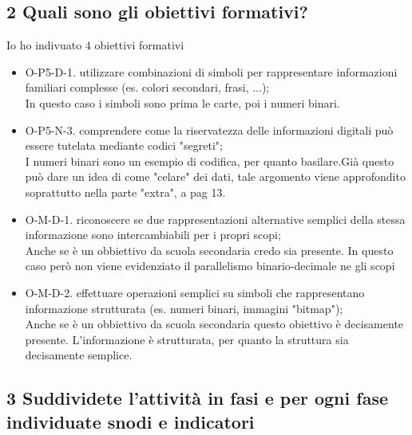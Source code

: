 \documentclass[a4paper]{article}
\begin{document}
\subsection{2 Quali sono gli obiettivi formativi?}
Io ho indivuato 4 obiettivi formativi
\begin{itemize}
	\item O-P5-D-1. utilizzare combinazioni di simboli per rappresentare informazioni familiari complesse (es. colori secondari, frasi, ...);\\
		In questo caso i simboli sono prima le carte, poi i numeri binari.
	\item O-P5-N-3. comprendere come la riservatezza delle informazioni digitali può essere tutelata mediante codici "segreti";\\
		I numeri binari sono un esempio di codifica, per quanto basilare.Già questo può dare un idea di come "celare" dei dati, tale argomento viene approfondito soprattutto nella parte "extra", a pag 13.  
	\item O-M-D-1. riconoscere se due rappresentazioni alternative semplici della stessa informazione sono intercambiabili per i propri scopi;\\
		Anche se è un obbiettivo da scuola secondaria credo sia presente. In questo caso però non viene evidenziato il parallelismo binario-decimale ne gli scopi
	\item O-M-D-2. effettuare operazioni semplici su simboli che rappresentano informazione strutturata (es. numeri binari, immagini "bitmap");\\ 
		Anche se è un obbiettivo da scuola secondaria questo obiettivo è decisamente presente. L'informazione è strutturata, per quanto la struttura sia decisamente semplice.
\end{itemize}
\subsection{3 Suddividete l’attività in fasi e per ogni fase individuate snodi  e indicatori}
\end{document}
